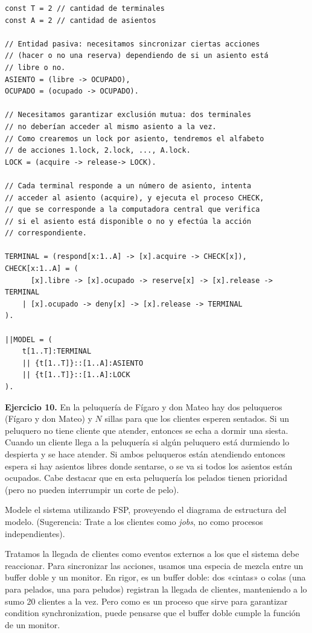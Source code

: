 \documentclass[a4paper, 12pt]{article}
\begin{document}
\pagebreak


\begin{verbatim}
const T = 2 // cantidad de terminales
const A = 2 // cantidad de asientos

// Entidad pasiva: necesitamos sincronizar ciertas acciones
// (hacer o no una reserva) dependiendo de si un asiento está
// libre o no.
ASIENTO = (libre -> OCUPADO),
OCUPADO = (ocupado -> OCUPADO).

// Necesitamos garantizar exclusión mutua: dos terminales 
// no deberían acceder al mismo asiento a la vez.
// Como crearemos un lock por asiento, tendremos el alfabeto
// de acciones 1.lock, 2.lock, ..., A.lock.
LOCK = (acquire -> release-> LOCK).

// Cada terminal responde a un número de asiento, intenta
// acceder al asiento (acquire), y ejecuta el proceso CHECK,
// que se corresponde a la computadora central que verifica
// si el asiento está disponible o no y efectúa la acción
// correspondiente.

TERMINAL = (respond[x:1..A] -> [x].acquire -> CHECK[x]),
CHECK[x:1..A] = (
	  [x].libre -> [x].ocupado -> reserve[x] -> [x].release -> TERMINAL
	| [x].ocupado -> deny[x] -> [x].release -> TERMINAL
).

||MODEL = (
    t[1..T]:TERMINAL 
    || {t[1..T]}::[1..A]:ASIENTO 
    || {t[1..T]}::[1..A]:LOCK
).
\end{verbatim}
\pagebreak 

\begin{myframe}
    \textbf{Ejercicio 10.} En la peluquería de Fígaro y don Mateo hay dos peluqueros
(Fígaro y don Mateo) y $N$ sillas para que los clientes esperen sentados. Si un
peluquero no tiene cliente que atender, entonces se echa a dormir una siesta.
Cuando un cliente llega a la peluquería si algún peluquero está durmiendo lo
despierta y se hace atender. Si ambos peluqueros están atendiendo entonces
espera si hay asientos libres donde sentarse, o se va si todos los asientos están
ocupados. Cabe destacar que en esta peluquería los pelados tienen prioridad
(pero no pueden interrumpir un corte de pelo).

Modele el sistema utilizando FSP, proveyendo el diagrama de estructura del
modelo. (Sugerencia: Trate a los clientes como \textit{jobs}, no como procesos
independientes).
\end{myframe}

Tratamos la llegada de clientes como eventos externos a los que el sistema debe
reaccionar. Para sincronizar las acciones, usamos una especia de mezcla entre un
buffer doble y un monitor. En rigor, es un buffer doble: dos «cintas» o colas
(una para pelados, una para peludos) registran la llegada de clientes,
manteniendo a lo sumo 20 clientes a la vez. Pero como es un proceso que sirve
para garantizar condition synchronization, puede pensarse que el buffer doble
cumple la función de un monitor.
\end{document}
